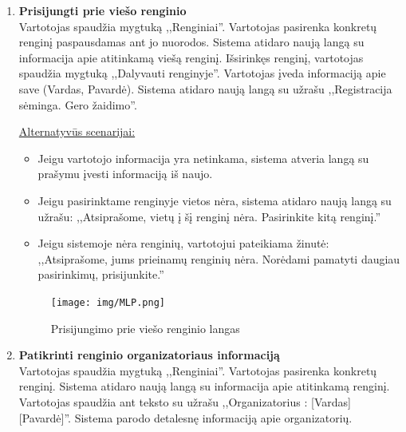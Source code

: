 \documentclass{VUMIFPSkursinis}
\begin{document}
\begin{enumerate} [label = \textbf{U\arabic*.}]
					\underline{Alternatyvūs scenarijai:}
					\begin{itemize}
						\item Jeigu sistemoje yra mažiau nei 15 renginių, pirmame puslapyje vaizduojami visi esantys renginiai. 
						\item Jeigu sistemoje nėra renginių, vartotojui pateikiama žinutė:
						,,Atsiprašome, jums prieinamų renginių nėra. Norėdami pamatyti daugiau pasirinkimų, prisijunkite.''
					\end{itemize}

				\begin{figure}[H]
					\centering
					\texttt{[image: img/MLP.png]}
					\caption{Konkretaus renginio langas}
					\label{fig:konkretaus-renginio-langas}
				\end{figure}
			\item \textbf{Prisijungti prie viešo renginio} \\
					Vartotojas spaudžia mygtuką ,,Renginiai''. 
					Vartotojas pasirenka konkretų renginį paspausdamas ant jo nuorodos.
					Sistema atidaro naują langą su informacija apie atitinkamą viešą renginį.
					Išsirinkęs renginį, vartotojas spaudžia mygtuką ,,Dalyvauti renginyje''. 
					Vartotojas įveda informaciją apie save (Vardas, Pavardė). 
					Sistema atidaro naują langą su užrašu ,,Registracija sėminga. Gero žaidimo''.
					
					\underline{Alternatyvūs scenarijai:}
					\begin{itemize}
						\item Jeigu vartotojo informacija yra netinkama, sistema atveria langą su prašymu įvesti informaciją iš naujo. 
						\item Jeigu pasirinktame renginyje vietos nėra, 
						sistema atidaro naują langą su užrašu: ,,Atsiprašome, vietų į šį renginį nėra. Pasirinkite kitą renginį.''
						\item Jeigu sistemoje nėra renginių, vartotojui pateikiama žinutė:
						,,Atsiprašome, jums prieinamų renginių nėra. Norėdami pamatyti daugiau pasirinkimų, prisijunkite.''
					\end{itemize}

				\begin{figure}[H]
					\centering
					\texttt{[image: img/MLP.png]}
					\caption{Prisijungimo prie viešo renginio langas}
					\label{fig:prisijungti-prie-vieso-renginio}
				\end{figure}

				\item \textbf{Patikrinti renginio organizatoriaus informaciją} \\
					Vartotojas spaudžia mygtuką ,,Renginiai''. 
					Vartotojas pasirenka konkretų renginį. 
					Sistema atidaro naują langą su informacija apie atitinkamą renginį. 
					Vartotojas spaudžia ant teksto su užrašu ,,Organizatorius : [Vardas] [Pavardė]''.
					Sistema parodo detalesnę informaciją apie organizatorių.
					

\end{enumerate}
\end{document}
